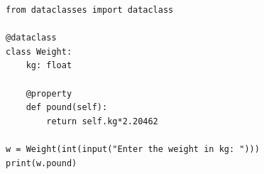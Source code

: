 \begin{verbatim}
from dataclasses import dataclass

@dataclass
class Weight:
    kg: float
    
    @property
    def pound(self):
        return self.kg*2.20462

w = Weight(int(input("Enter the weight in kg: ")))
print(w.pound)
\end{verbatim}